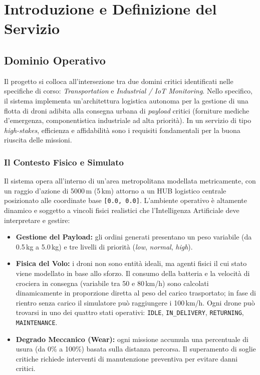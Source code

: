
\chapter{Introduzione e Definizione del Servizio}
\label{cap:introduzione_definizione}

\section{Dominio Operativo}
\label{sec:dominio_operativo}

Il progetto si colloca all'intersezione tra due domini critici identificati nelle specifiche di corso: \textit{Transportation} e \textit{Industrial / IoT Monitoring}. Nello specifico, il sistema implementa un'architettura logistica autonoma per la gestione di una flotta di droni adibita alla consegna urbana di \textit{payload} critici (forniture mediche d'emergenza, componentistica industriale ad alta priorità). In un servizio di tipo \textit{high-stakes}, efficienza e affidabilità sono i requisiti fondamentali per la buona riuscita delle missioni.

\subsection*{Il Contesto Fisico e Simulato}

Il sistema opera all'interno di un'area metropolitana modellata metricamente, con un raggio d'azione di 5000\,m (5\,km) attorno a un HUB logistico centrale posizionato alle coordinate base \texttt{[0.0, 0.0]}. L'ambiente operativo è altamente dinamico e soggetto a vincoli fisici realistici che l'Intelligenza Artificiale deve interpretare e gestire:

\begin{itemize}
    \item \textbf{Gestione del Payload:} gli ordini generati presentano un peso variabile (da 0.5\,kg a 5.0\,kg) e tre livelli di priorità (\textit{low}, \textit{normal}, \textit{high}).
    \item \textbf{Fisica del Volo:} i droni non sono entità ideali, ma agenti fisici il cui stato viene modellato in base allo sforzo. Il consumo della batteria e la velocità di crociera in consegna (variabile tra 50 e 80\,km/h) sono calcolati dinamicamente in proporzione diretta al peso del carico trasportato; in fase di rientro senza carico il simulatore può raggiungere i 100\,km/h. Ogni drone può trovarsi in uno dei quattro stati operativi: \texttt{IDLE}, \texttt{IN\_DELIVERY}, \texttt{RETURNING}, \texttt{MAINTENANCE}.
    \item \textbf{Degrado Meccanico (Wear):} ogni missione accumula una percentuale di usura (da 0\% a 100\%) basata sulla distanza percorsa. Il superamento di soglie critiche richiede interventi di manutenzione preventiva per evitare danni critici.
\end{itemize}

